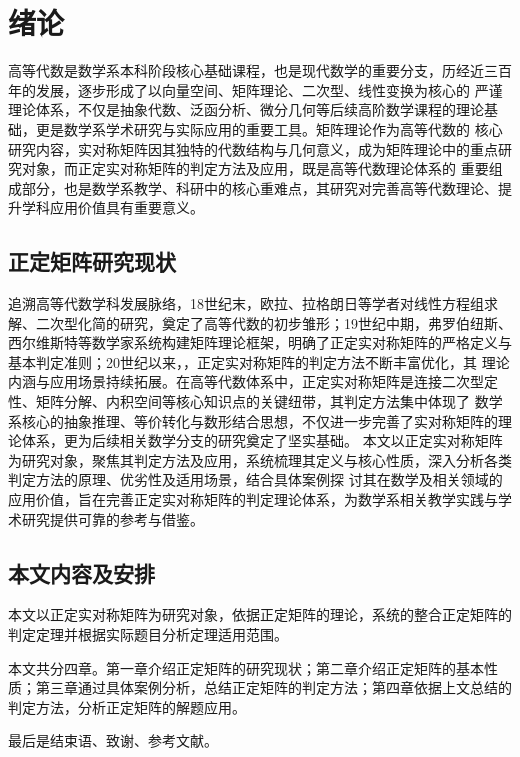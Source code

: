 \chapter{绪论}\label{chpt:1}
高等代数是数学系本科阶段核心基础课程，也是现代数学的重要分支，历经近三百年的发展，逐步形成了以向量空间、矩阵理论、二次型、线性变换为核心的
严谨理论体系，不仅是抽象代数、泛函分析、微分几何等后续高阶数学课程的理论基础，更是数学系学术研究与实际应用的重要工具。矩阵理论作为高等代数的
核心研究内容，实对称矩阵因其独特的代数结构与几何意义，成为矩阵理论中的重点研究对象，而正定实对称矩阵的判定方法及应用，既是高等代数理论体系的
重要组成部分，也是数学系教学、科研中的核心重难点，其研究对完善高等代数理论、提升学科应用价值具有重要意义。
\section{正定矩阵研究现状}\label{subsec:1}  %
追溯高等代数学科发展脉络，18世纪末，欧拉、拉格朗日等学者对线性方程组求解、二次型化简的研究，奠定了高等代数的初步雏形；19世纪中期，弗罗伯纽斯、
西尔维斯特等数学家系统构建矩阵理论框架，明确了正定实对称矩阵的严格定义与基本判定准则；20世纪以来，，正定实对称矩阵的判定方法不断丰富优化，其
理论内涵与应用场景持续拓展。在高等代数体系中，正定实对称矩阵是连接二次型定性、矩阵分解、内积空间等核心知识点的关键纽带，其判定方法集中体现了
数学系核心的抽象推理、等价转化与数形结合思想，不仅进一步完善了实对称矩阵的理论体系，更为后续相关数学分支的研究奠定了坚实基础。
本文以正定实对称矩阵为研究对象，聚焦其判定方法及应用，系统梳理其定义与核心性质，深入分析各类判定方法的原理、优劣性及适用场景，结合具体案例探
讨其在数学及相关领域的应用价值，旨在完善正定实对称矩阵的判定理论体系，为数学系相关教学实践与学术研究提供可靠的参考与借鉴。
\section{本文内容及安排}
本文以正定实对称矩阵为研究对象，依据正定矩阵的理论，系统的整合正定矩阵的判定定理并根据实际题目分析定理适用范围。

本文共分四章。第一章介绍正定矩阵的研究现状；第二章介绍正定矩阵的基本性质；第三章通过具体案例分析，总结正定矩阵的判定方法；第四章依据上文总结的判定方法，分析正定矩阵的解题应用。

最后是结束语、致谢、参考文献。